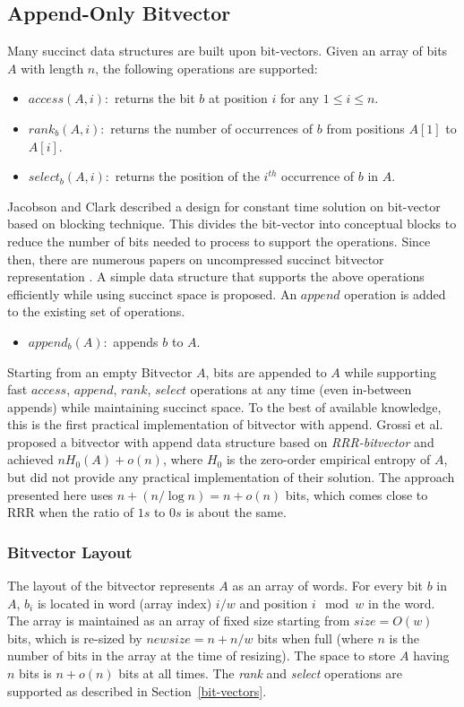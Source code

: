 \subsection{Append-Only Bitvector}
Many succinct data structures are built upon bit-vectors. Given an array of bits $A$ with length $n$, the following operations are supported:
\begin{itemize}
    \item $access(A, i): $ returns the bit $b$ at position $i$ for any $1 \leq i \leq n$.
    \item $rank_b(A, i):$ returns the number of occurrences of $b$ from positions $A[1]$ to $A[i]$.
    \item $select_b(A, i):$ returns the position of the $i^{th}$ occurrence of $b$ in $A$.
\end{itemize}
Jacobson \cite{Jacobson_1989} and Clark \cite{Clark_1998} described a design for constant time solution on bit-vector based on blocking technique. This divides the bit-vector into conceptual blocks to reduce the number of bits needed to process to support the operations. Since then, there are numerous papers on uncompressed succinct bitvector representation \cite{Navarro_2012, Vigna_2008, Zhou_2013}.
A simple data structure that supports the above operations efficiently while using succinct space is proposed. An $append$ operation is added to the existing set of operations.
\begin{itemize}
   \item $append_b(A): $ appends $b$ to $A$.
\end{itemize}
Starting from an empty Bitvector $A$, bits are appended to $A$ while supporting fast $access$, $append$, $rank$, $select$ operations at any time (even in-between appends) while maintaining succinct space. To the best of available knowledge, this is the first practical implementation of bitvector with append. Grossi et al.~\cite{Grossi_2012} proposed a bitvector with append data structure based on \textit{RRR-bitvector} and achieved $nH_0(A) +o(n)$, where $H_0$ is the zero-order empirical entropy of $A$, but did not provide any practical implementation of their solution. The approach presented here uses $n + (n/\log n) = n + o(n)$ bits, which comes close to RRR when the ratio of $1s$ to $0s$ is about the same.
\subsubsection{Bitvector Layout}
The layout of the bitvector represents $A$ as an array of words. For every bit $b$ in $A$, $b_i$ is located in word (array index) $i/w$ and position $i\mod w$ in the word. The array is maintained as an array of fixed size starting from $size=O(w)$ bits, which is re-sized by $new size = n + n/w$ bits when full (where $n$ is the number of bits in the array at the time of resizing). The space to store $A$ having $n$ bits is $n + o(n)$ bits at all times. The \textit{rank} and \textit{select} operations are supported as described in Section~\ref{bit-vectors}.
